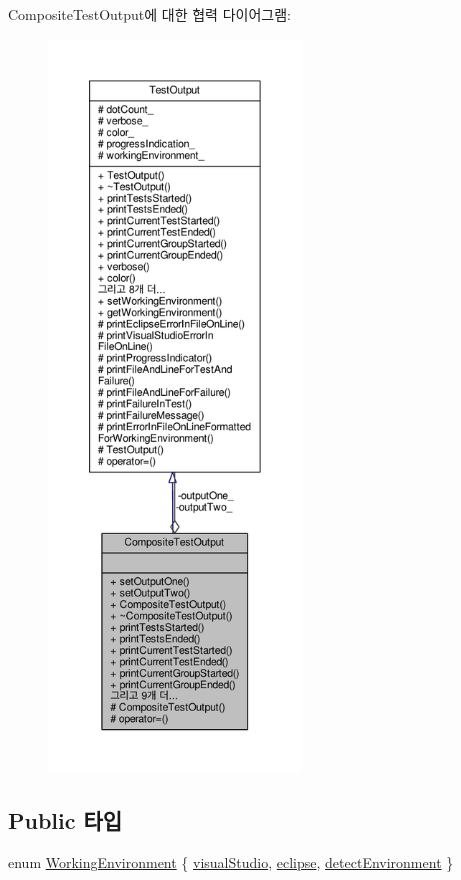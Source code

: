 Composite\+Test\+Output에 대한 협력 다이어그램\+:
\nopagebreak
\begin{figure}[H]
\begin{center}
\leavevmode
\includegraphics[height=550pt]{class_composite_test_output__coll__graph}
\end{center}
\end{figure}
\subsection*{Public 타입}
\begin{DoxyCompactItemize}
\item 
enum \hyperlink{class_test_output_a0541851f863713454486a9fb3080f766}{Working\+Environment} \{ \hyperlink{class_test_output_a0541851f863713454486a9fb3080f766a47f3a5b9ed4237588024b983a4ca8399}{visual\+Studio}, 
\hyperlink{class_test_output_a0541851f863713454486a9fb3080f766abf6505364f680c2682d5648cd0c76f53}{eclipse}, 
\hyperlink{class_test_output_a0541851f863713454486a9fb3080f766a3f11f791db94db142e33c3c75442ed10}{detect\+Environment}
 \}
\end{DoxyCompactItemize}
